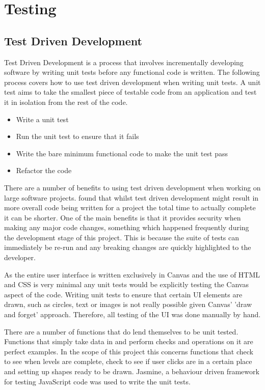 \documentclass[12pt,a4paper]{report}
\begin{document}
\chapter{Testing}

\section{Test Driven Development}
Test Driven Development is a process that involves incrementally developing software by writing unit tests before any functional code is written. The following process covers how to use test driven development when writing unit tests. A unit test aims to take the smallest piece of testable code from an application and test it in isolation from the rest of the code. 

\begin{itemize}
   \item Write a unit test
   \item Run the unit test to ensure that it fails
   \item Write the bare minimum functional code to make the unit test pass
   \item Refactor the code
\end{itemize}

   There are a number of benefits to using test driven development when working on large software projects. \cite{muller2003return} found that whilst test driven development might result in more overall code being written for a project the total time to actually complete it can be shorter. One of the main benefits is that it provides security when making any major code changes, something which happened frequently during the development stage of this project. This is because the suite of tests can immediately be re-run and any breaking changes are quickly highlighted to the developer.

As the entire user interface is written exclusively in Canvas and the use of HTML and CSS is very minimal any unit tests would be explicitly testing the Canvas aspect of the code. Writing unit tests to ensure that certain UI elements are drawn, such as circles, text or images is not really possible given Canvas' 'draw and forget' approach. Therefore, all testing of the UI was done manually by hand.

There are a number of functions that do lend themselves to be unit tested. Functions that simply take data in and perform checks and operations on it are perfect examples. In the scope of this project this concerns functions that check to see when levels are complete, check to see if user clicks are in a certain place and setting up shapes ready to be drawn. Jasmine, a behaviour driven framework for testing JavaScript code was used to write the unit tests.
\end{document}

